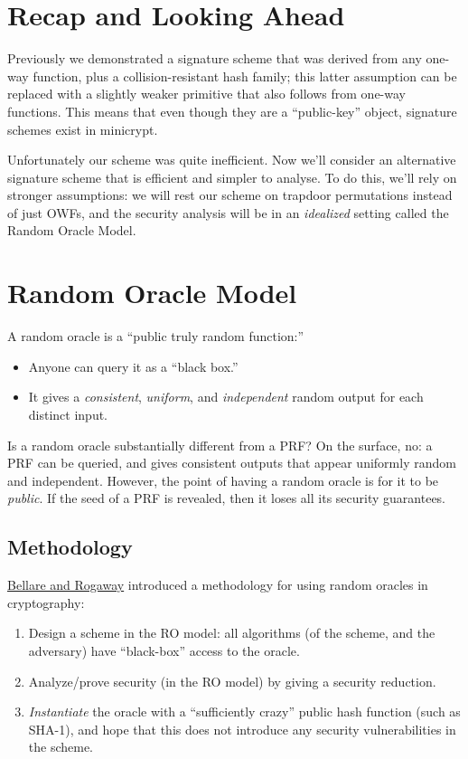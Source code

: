 \documentclass[11pt]{article}
\begin{document}
\thispagestyle{fancy}           %


\section{Recap and Looking Ahead}
\label{sec:recap-looking-ahead}

Previously we demonstrated a signature scheme that was derived from
any one-way function, plus a collision-resistant hash family; this
latter assumption can be replaced with a slightly weaker primitive
that also follows from one-way functions.  This means that even though
they are a ``public-key'' object, signature schemes exist in
minicrypt.

Unfortunately our scheme was quite inefficient.  Now we'll consider an
alternative signature scheme that is efficient and simpler to analyse.
To do this, we'll rely on stronger assumptions: we will rest our
scheme on trapdoor permutations instead of just OWFs, and the security
analysis will be in an \emph{idealized} setting called the Random
Oracle Model.

\section{Random Oracle Model}
\label{sec:random-oracle-model}

A random oracle is a ``public truly random function:''
\begin{itemize}
\item Anyone can query it as a ``black box.''
\item It gives a \emph{consistent}, \emph{uniform}, and
  \emph{independent} random output for each distinct input.
\end{itemize}

Is a random oracle substantially different from a PRF?  On the
surface, no: a PRF can be queried, and gives consistent outputs that
appear uniformly random and independent.  However, the point of having
a random oracle is for it to be \emph{public}.  If the seed of a PRF
is revealed, then it loses all its security guarantees.

\subsection{Methodology}
\label{sec:ro-methodology}

\href{http://cseweb.ucsd.edu/users/mihir/papers/ro.html}{Bellare and
  Rogaway} introduced a methodology for using random oracles in
cryptography:
\begin{enumerate}
\item Design a scheme in the RO model: all algorithms (of the scheme,
  and the adversary) have ``black-box'' access to the oracle.
\item Analyze/prove security (in the RO model) by giving a security
  reduction.
\item \emph{Instantiate} the oracle with a ``sufficiently crazy''
  public hash function (such as SHA-1), and hope that this does not
  introduce any security vulnerabilities in the scheme.
\end{enumerate}
\end{document}
